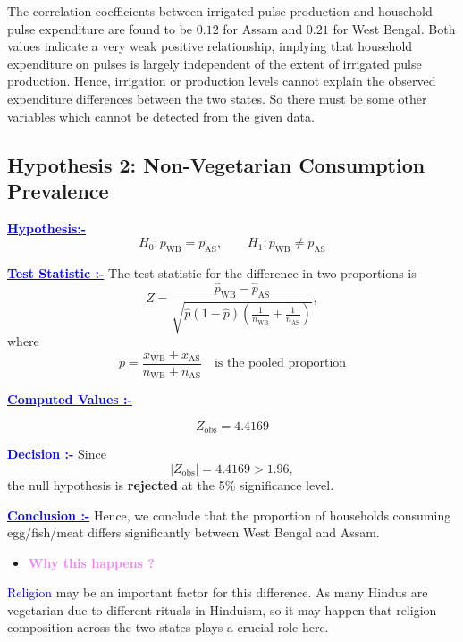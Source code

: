 The correlation coefficients between irrigated pulse production and household pulse expenditure are found to be $0.12$ for Assam and $0.21$ for West Bengal. Both values indicate a very weak positive relationship, implying that household expenditure on pulses is largely independent of the extent of irrigated pulse production. Hence, irrigation or production levels cannot explain the observed 
expenditure differences between the two states. So there must be some other variables which cannot be detected from the given data.

\vspace{4 mm}

\subsection{\textbf{\textcolor{deepgreen}{\large{Hypothesis 2: Non-Vegetarian Consumption Prevalence}}}}

\vspace{2 mm}
\underline{\textbf{\textcolor{blue}{Hypothesis:-}}}
\[
H_0: p_{\text{WB}} = p_{\text{AS}}, \qquad 
H_1: p_{\text{WB}} \neq p_{\text{AS}}
\]

\underline{\textbf{\textcolor{blue}{Test Statistic :-}}}
The test statistic for the difference in two proportions is
\[
Z = \frac{\hat{p}_{\text{WB}} - \hat{p}_{\text{AS}}}
        {\sqrt{\hat{p}(1-\hat{p})\left(\frac{1}{n_{\text{WB}}} + \frac{1}{n_{\text{AS}}}\right)}},
\]
where
\[
\hat{p} = \frac{x_{\text{WB}} + x_{\text{AS}}}{n_{\text{WB}} + n_{\text{AS}}} \quad\text{is the pooled proportion}
\]
 

\underline{\textbf{\textcolor{blue}{Computed Values :-}}}

\[
Z_{\text{obs}} = 4.4169
\]

\underline{\textbf{\textcolor{blue}{Decision :-}}}
Since
\[
|Z_{\text{obs}}| = 4.4169 > 1.96,
\]
the null hypothesis is \textcolor{deepgreen}{\textbf{rejected}} at the 5\% significance level.

\underline{\textbf{\textcolor{blue}{Conclusion :-}}}
Hence, we conclude that the proportion of households consuming
egg/fish/meat differs significantly between West Bengal and Assam.

\vspace{2 mm}
\begin{itemize}
    \item \textbf{\textcolor{violet}{\large{Why this happens ?}}}
\end{itemize}
\textcolor{blue}{Religion} may be an important factor for this difference. As many Hindus are vegetarian due to different rituals in Hinduism, so it may happen that religion composition across the two states plays a crucial role here.

